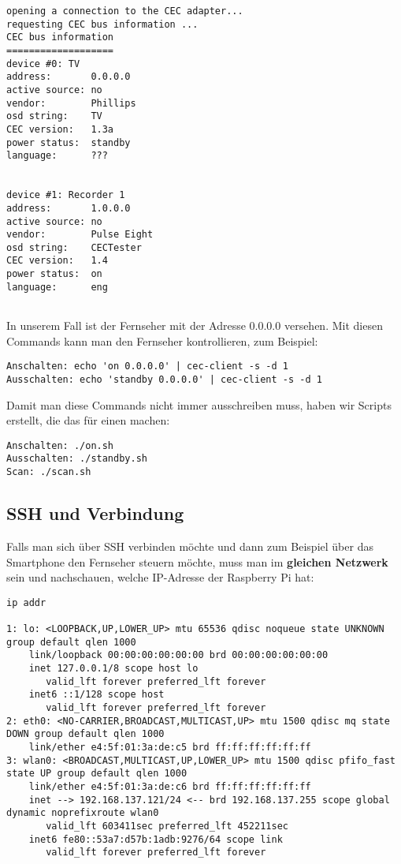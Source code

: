 \documentclass[a4paper]{article}
\begin{document}
\begin{lstlisting}
opening a connection to the CEC adapter...
requesting CEC bus information ...
CEC bus information
===================
device #0: TV
address:       0.0.0.0
active source: no
vendor:        Phillips
osd string:    TV
CEC version:   1.3a
power status:  standby
language:      ???


device #1: Recorder 1
address:       1.0.0.0
active source: no
vendor:        Pulse Eight
osd string:    CECTester
CEC version:   1.4
power status:  on
language:      eng


\end{lstlisting}
\noindent
In unserem Fall ist der Fernseher mit der Adresse 0.0.0.0 versehen.
Mit diesen Commands kann man den Fernseher kontrollieren, zum Beispiel:
\begin{lstlisting}
Anschalten: echo 'on 0.0.0.0' | cec-client -s -d 1
Ausschalten: echo 'standby 0.0.0.0' | cec-client -s -d 1
\end{lstlisting}
\noindent
Damit man diese Commands nicht immer ausschreiben muss, haben wir Scripts erstellt, die das für einen machen:
\begin{lstlisting}
Anschalten: ./on.sh
Ausschalten: ./standby.sh
Scan: ./scan.sh
\end{lstlisting}
\newpage
\noindent
\subsection{SSH und Verbindung}
Falls man sich über SSH verbinden möchte und dann zum Beispiel über das Smartphone den Fernseher steuern möchte, muss man im \textbf{gleichen Netzwerk} sein und nachschauen, welche IP-Adresse der Raspberry Pi hat:
\begin{lstlisting}
ip addr

1: lo: <LOOPBACK,UP,LOWER_UP> mtu 65536 qdisc noqueue state UNKNOWN group default qlen 1000
    link/loopback 00:00:00:00:00:00 brd 00:00:00:00:00:00
    inet 127.0.0.1/8 scope host lo
       valid_lft forever preferred_lft forever
    inet6 ::1/128 scope host
       valid_lft forever preferred_lft forever
2: eth0: <NO-CARRIER,BROADCAST,MULTICAST,UP> mtu 1500 qdisc mq state DOWN group default qlen 1000
    link/ether e4:5f:01:3a:de:c5 brd ff:ff:ff:ff:ff:ff
3: wlan0: <BROADCAST,MULTICAST,UP,LOWER_UP> mtu 1500 qdisc pfifo_fast state UP group default qlen 1000
    link/ether e4:5f:01:3a:de:c6 brd ff:ff:ff:ff:ff:ff
    inet --> 192.168.137.121/24 <-- brd 192.168.137.255 scope global dynamic noprefixroute wlan0
       valid_lft 603411sec preferred_lft 452211sec
    inet6 fe80::53a7:d57b:1adb:9276/64 scope link
       valid_lft forever preferred_lft forever

\end{lstlisting}
\end{document}
